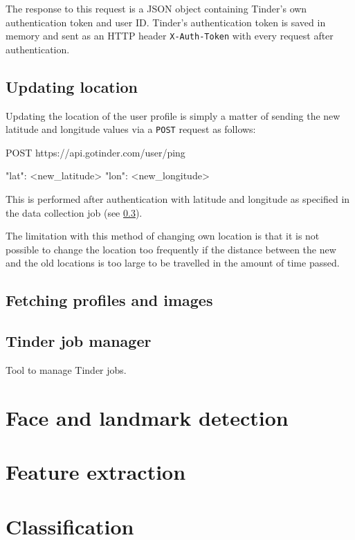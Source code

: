 The response to this request is a JSON object containing Tinder's own 
authentication token and user ID. Tinder's authentication token is saved in 
memory and sent as an HTTP header \texttt{X-Auth-Token} with every request 
after authentication.


\subsection{Updating location}
Updating the location of the user profile is simply a matter of sending the 
new latitude and longitude values via a \texttt{POST} request as follows:
\begin{logs}
POST https://api.gotinder.com/user/ping

{
    "lat": <new_latitude>
    "lon": <new_longitude>
}
\end{logs}
This is performed after authentication with latitude and longitude as 
specified in the data collection job (see \ref{spec:data:jobs}).

The limitation with this method of changing own location is that it is not 
possible to change the location too frequently if the distance between the new 
and the old locations is too large to be travelled in the amount of time 
passed.

\subsection{Fetching profiles and images}

\subsection{Tinder job manager}
\label{spec:data:jobs}
Tool to manage Tinder jobs.

\section{Face and landmark detection}

\section{Feature extraction}

\section{Classification}

